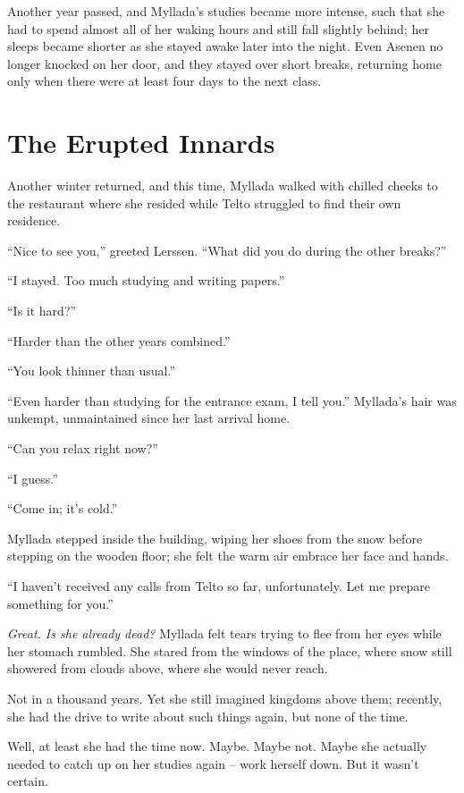 Another year passed, and Myllada's studies became more intense, such that she had to spend almost all of her waking hours and still fall slightly behind; her sleeps became shorter as she stayed awake later into the night. Even Asenen no longer knocked on her door, and they stayed over short breaks, returning home only when there were at least four days to the next class.

\chapter{The Erupted Innards}

Another winter returned, and this time, Myllada walked with chilled cheeks to the restaurant where she resided while Telto struggled to find their own residence.

``Nice to see you,'' greeted Lerssen. ``What did you do during the other breaks?''

``I stayed. Too much studying and writing papers.''

``Is it hard?''

``Harder than the other years combined.''

``You look thinner than usual.''

``Even harder than studying for the entrance exam, I tell you.'' Myllada's hair was unkempt, unmaintained since her last arrival home.

``Can you relax right now?''

``I guess.''

``Come in; it's cold.''

Myllada stepped inside the building, wiping her shoes from the snow before stepping on the wooden floor; she felt the warm air embrace her face and hands.

``I haven't received any calls from Telto so far, unfortunately. Let me prepare something for you.''

\emph{Great. Is she already dead?} Myllada felt tears trying to flee from her eyes while her stomach rumbled. She stared from the windows of the place, where snow still showered from clouds above, where she would never reach.

Not in a thousand years. Yet she still imagined kingdoms above them; recently, she had the drive to write about such things again, but none of the time.

Well, at least she had the time now. Maybe. Maybe not. Maybe she actually needed to catch up on her studies again -- work herself down. But it wasn't certain.

